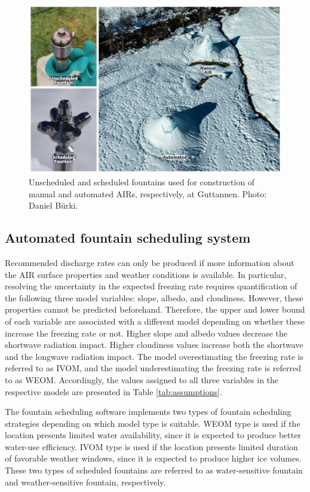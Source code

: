 \begin{figure}[htb]
	\includegraphics[width=\textwidth]{figs/AIR_fountains.jpg}
	\caption{Unscheduled and scheduled fountains used for construction of manual and automated AIRs, respectively, at
		Guttannen. Photo: Daniel Bürki.}
	\label{fig:autovsman}
\end{figure}

\subsection{Automated fountain scheduling system}

Recommended discharge rates can only be produced if more information about the AIR surface properties and
weather conditions is available. In particular, resolving the uncertainty in the expected freezing rate requires
quantification of the following three model variables: slope, albedo, and cloudiness. However, these properties
cannot be predicted beforehand. Therefore, the upper and lower bound of each variable are associated with a
different model depending on whether these increase the freezing rate or not.  Higher slope and albedo values
decrease the shortwave radiation impact. Higher cloudiness values increase both the shortwave and the longwave
radiation impact. The model overestimating the freezing rate is referred to as \ac{IVOM}, and the model
underestimating the freezing rate is referred to as  \ac{WEOM}. Accordingly, the values
assigned to all three variables in the respective models are presented in Table \ref{tab:assumptions}.

The fountain scheduling software implements two types of fountain scheduling strategies depending on which
model type is suitable. \ac{WEOM} type is used if the location presents limited water availability, since it is expected to
produce better water-use efficiency. \ac{IVOM} type is used if the location presents limited duration of favorable
weather windows, since it is expected to produce higher ice volumes. These two types of scheduled fountains are referred to as water-sensitive fountain and weather-sensitive fountain, respectively.

